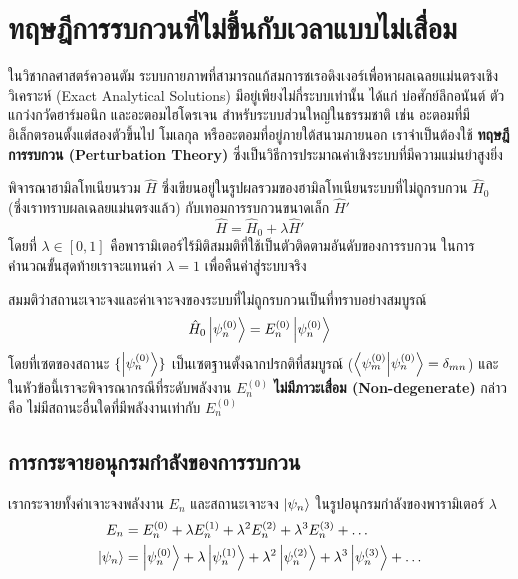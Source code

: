 \newpage
\section{ทฤษฎีการรบกวนที่ไม่ขึ้นกับเวลาแบบไม่เสื่อม}

ในวิชากลศาสตร์ควอนตัม ระบบกายภาพที่สามารถแก้สมการชเรอดิงเงอร์เพื่อหาผลเฉลยแม่นตรงเชิงวิเคราะห์ (Exact Analytical Solutions) มีอยู่เพียงไม่กี่ระบบเท่านั้น ได้แก่ บ่อศักย์ลึกอนันต์ ตัวแกว่งกวัดฮาร์มอนิก และอะตอมไฮโดรเจน สำหรับระบบส่วนใหญ่ในธรรมชาติ เช่น อะตอมที่มีอิเล็กตรอนตั้งแต่สองตัวขึ้นไป โมเลกุล หรืออะตอมที่อยู่ภายใต้สนามภายนอก เราจำเป็นต้องใช้ \textbf{ทฤษฎีการรบกวน (Perturbation Theory)} ซึ่งเป็นวิธีการประมาณค่าเชิงระบบที่มีความแม่นยำสูงยิ่ง

พิจารณาฮามิลโทเนียนรวม $\hat{H}$ ซึ่งเขียนอยู่ในรูปผลรวมของฮามิลโทเนียนระบบที่ไม่ถูกรบกวน $\hat{H}_0$ (ซึ่งเราทราบผลเฉลยแม่นตรงแล้ว) กับเทอมการรบกวนขนาดเล็ก $\hat{H}'$
\begin{equation}
\hat{H} = \hat{H}_0 + \lambda \hat{H}'
\label{eq:perturbation_hamiltonian}
\end{equation}
โดยที่ $\lambda \in [0, 1]$ คือพารามิเตอร์ไร้มิติสมมติที่ใช้เป็นตัวติดตามอันดับของการรบกวน ในการคำนวณขั้นสุดท้ายเราจะแทนค่า $\lambda = 1$ เพื่อคืนค่าสู่ระบบจริง

สมมติว่าสถานะเจาะจงและค่าเจาะจงของระบบที่ไม่ถูกรบกวนเป็นที่ทราบอย่างสมบูรณ์
\begin{equation}
\hat{H}_0 \ket{\psi_n^{(0)}} = E_n^{(0)} \ket{\psi_n^{(0)}}
\end{equation}
โดยที่เซตของสถานะ $\{ \ket{\psi_n^{(0)}} \}$ เป็นเซตฐานตั้งฉากปรกติที่สมบูรณ์ ($\braket{\psi_m^{(0)}}{\psi_n^{(0)}} = \delta_{mn}$) และในหัวข้อนี้เราจะพิจารณากรณีที่ระดับพลังงาน $E_n^{(0)}$ \textbf{ไม่มีภาวะเสื่อม (Non-degenerate)} กล่าวคือ ไม่มีสถานะอื่นใดที่มีพลังงานเท่ากับ $E_n^{(0)}$

\subsection{การกระจายอนุกรมกำลังของการรบกวน}
เรากระจายทั้งค่าเจาะจงพลังงาน $E_n$ และสถานะเจาะจง $\ket{\psi_n}$ ในรูปอนุกรมกำลังของพารามิเตอร์ $\lambda$
\begin{align}
E_n &= E_n^{(0)} + \lambda E_n^{(1)} + \lambda^2 E_n^{(2)} + \lambda^3 E_n^{(3)} + \dots \label{eq:e_series} \\
\ket{\psi_n} &= \ket{\psi_n^{(0)}} + \lambda \ket{\psi_n^{(1)}} + \lambda^2 \ket{\psi_n^{(2)}} + \lambda^3 \ket{\psi_n^{(3)}} + \dots \label{eq:psi_series}
\end{align}


